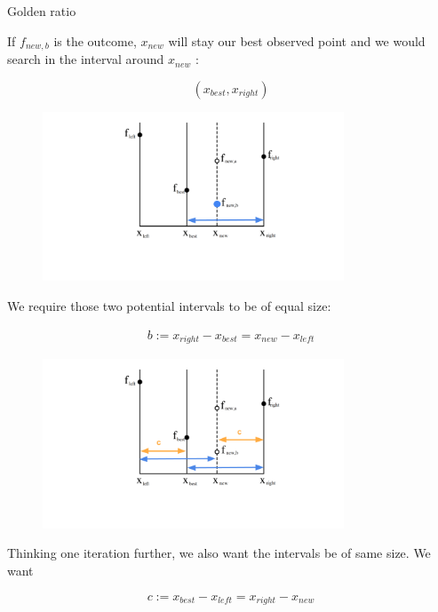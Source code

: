 \documentclass[11pt,compress,t,notes=noshow, xcolor=table]{beamer}
\begin{document}
\begin{vbframe}{Golden ratio}
\framebreak 

If $f_{new, b}$ is the outcome, $x_{new}$ will stay our best observed point and we would search in the interval around $x_{new}$ : 

$$
    (x_{best}, x_{right}) 
$$

\begin{figure}
\includegraphics[width=0.8\textwidth]{figure_man/goldensec-2.png}\\
\end{figure}

\framebreak 

We require those two potential intervals to be of equal size: 

\begin{eqnarray*}
    b := x_{right} - x_{best} = x_{new} - x_{left}
\end{eqnarray*}

\begin{figure}
\includegraphics[width=0.8\textwidth]{figure_man/goldensec-3.png}\\
\end{figure}

\framebreak 

Thinking one iteration further, we also want the intervals be of same size. We want 

\begin{eqnarray*}
    c := x_{best} - x_{left} = x_{right} - x_{new}
\end{eqnarray*}


\end{vbframe}
\end{document}
